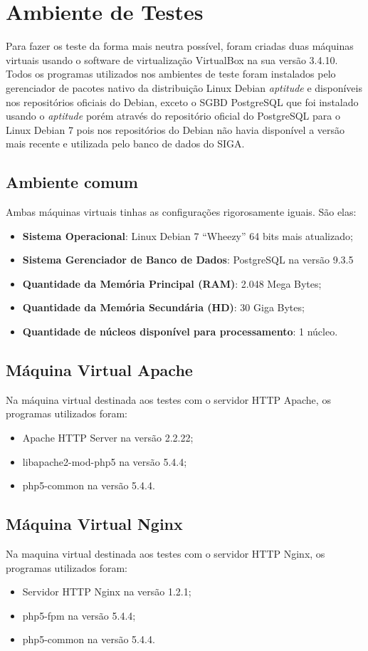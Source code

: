 \chapter{Ambiente de Testes}\label{ambiente-de-testes}

Para fazer os teste da forma mais neutra possível, foram criadas duas máquinas virtuais usando o software de virtualização VirtualBox na sua versão 3.4.10.\\
Todos os programas utilizados nos ambientes de teste foram instalados pelo gerenciador de pacotes nativo da distribuição Linux Debian \textit{aptitude} e disponíveis nos repositórios oficiais do Debian, exceto o SGBD PostgreSQL que foi instalado usando o \textit{aptitude} porém através do repositório oficial do PostgreSQL para o Linux Debian 7 pois nos repositórios do Debian não havia disponível a versão mais recente e utilizada pelo banco de dados do SIGA.

\section{Ambiente comum}
 Ambas máquinas virtuais tinhas as configurações rigorosamente iguais. São elas:
\begin{itemize}
\item \textbf{Sistema Operacional}: Linux Debian 7 “Wheezy” 64 bits mais atualizado;
\item \textbf{Sistema Gerenciador de Banco de Dados}: PostgreSQL na versão 9.3.5
\item \textbf{Quantidade da Memória Principal (RAM)}: 2.048 Mega Bytes;
\item \textbf{Quantidade da Memória Secundária (HD)}: 30 Giga Bytes;
\item \textbf{Quantidade de núcleos disponível para processamento}: 1 núcleo.
\end{itemize}

\section{Máquina Virtual Apache}
Na máquina virtual destinada aos testes com o servidor HTTP Apache, os programas utilizados foram:
\begin{itemize}
\item Apache HTTP Server na versão 2.2.22;
\item libapache2-mod-php5 na versão 5.4.4;
\item php5-common na versão 5.4.4.
\end{itemize}

\section{Máquina Virtual Nginx}
Na maquina virtual destinada aos testes com o servidor HTTP Nginx, os programas utilizados foram:

\begin{itemize}
\item Servidor HTTP Nginx na versão 1.2.1;
\item php5-fpm na versão 5.4.4;
\item php5-common na versão 5.4.4.
\end{itemize}


